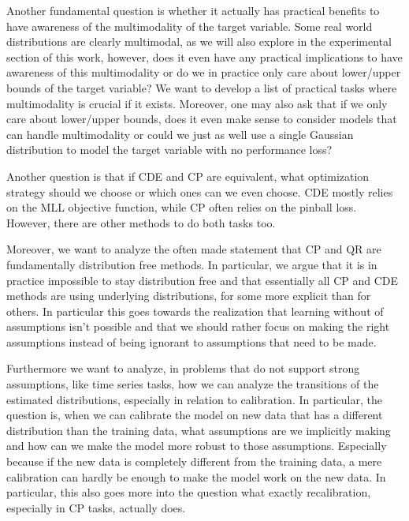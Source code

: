 Another fundamental question is whether it actually has practical benefits to have awareness of the multimodality of the target variable. Some real world distributions are clearly multimodal, as we will also explore in the experimental section of this work, however, does it even have any practical implications to have awareness of this multimodality or do we in practice only care about lower/upper bounds of the target variable? We want to develop a list of practical tasks where multimodality is crucial if it exists. Moreover, one may also ask that if we only care about lower/upper bounds, does it even make sense to consider models that can handle multimodality or could we just as well use a single Gaussian distribution to model the target variable with no performance loss?

Another question is that if CDE and CP are equivalent, what optimization strategy should we choose or which ones can we even choose. CDE mostly relies on the MLL objective function, while CP often relies on the pinball loss. However, there are other methods to do both tasks too.

Moreover, we want to analyze the often made statement that CP and QR are fundamentally distribution free methods. In particular, we argue that it is in practice impossible to stay distribution free and that essentially all CP and CDE methods are using underlying distributions, for some more explicit than for others. In particular this goes towards the realization that learning without of assumptions isn't possible \cite{wolpert_1996} and that we should rather focus on making the right assumptions instead of being ignorant to assumptions that need to be made.

Furthermore we want to analyze, in problems that do not support strong assumptions, like time series tasks, how we can analyze the transitions of the estimated distributions, especially in relation to calibration. In particular, the question is, when we can calibrate the model on new data that has a different distribution than the training data, what assumptions are we implicitly making and how can we make the model more robust to those assumptions. Especially because if the new data is completely different from the training data, a mere calibration can hardly be enough to make the model work on the new data. In particular, this also goes more into the question what exactly recalibration, especially in CP tasks, actually does.

